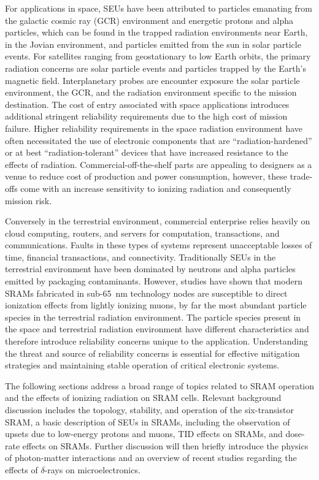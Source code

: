 For applications in space, SEUs have been attributed to particles emanating from the galactic cosmic ray (GCR) environment and energetic protons and alpha particles, which can be found in the trapped radiation environments near Earth, in the Jovian environment, and particles emitted from the sun in solar particle events.
For satellites ranging from geostationary to low Earth orbits, the primary radiation concerns are solar particle events and particles trapped by the Earth's magnetic field.
Interplanetary probes are encounter exposure the solar particle environment, the GCR, and the radiation environment specific to the mission destination.
The cost of entry associated with space applications introduces additional stringent reliability requirements due to the high cost of mission failure.
Higher reliability requirements in the space radiation environment have often necessitated the use of electronic components that are ``radiation-hardened'' or at best ``radiation-tolerant'' devices that have increased resistance to the effects of radiation.
Commercial-off-the-shelf parts are appealing to designers as a venue to reduce cost of production and power consumption, however, these trade-offs come with an increase sensitivity to ionizing radiation and consequently mission risk.

Conversely in the terrestrial environment, commercial enterprise relies heavily on cloud computing, routers, and servers for computation, transactions, and communications. 
Faults in these types of systems represent unacceptable losses of time, financial transactions, and connectivity. 
Traditionally SEUs in the terrestrial environment have been dominated by neutrons and alpha particles emitted by packaging contaminants.
However, studies have shown that modern SRAMs fabricated in sub-65~nm technology nodes are susceptible to direct ionization effects from lightly ionizing muons, by far the most abundant particle species in the terrestrial radiation environment.
The particle species present in the space and terrestrial radiation environment have different characteristics and therefore introduce reliability concerns unique to the application.
Understanding the threat and source of reliability concerns is essential for effective mitigation strategies and maintaining stable operation of critical electronic systems.

The following sections address a broad range of topics related to SRAM operation and the effects of ionizing radiation on SRAM cells. 
Relevant background discussion includes the topology, stability, and operation of the six-transistor SRAM, a basic description of SEUs in SRAMs, including the observation of upsets due to low-energy protons and muons, TID effects on SRAMs, and dose-rate effects on SRAMs.
Further discussion will then briefly introduce the physics of photon-matter interactions and an overview of recent studies regarding the effects of $\delta$-rays on microelectronics.

